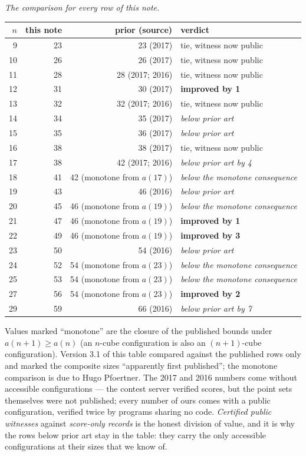 \documentclass[11pt,a4paper]{article}
\begin{document}
\emph{The comparison for every row of this note.}
\begin{center}
\begin{tabular}{rrrl}
\toprule
$n$ & this note & prior (source) & verdict\\
\midrule
 9 & 23 & 23 (2017) & tie, witness now public\\
10 & 26 & 26 (2017) & tie, witness now public\\
11 & 28 & 28 (2017; 2016) & tie, witness now public\\
12 & 31 & 30 (2017) & \textbf{improved by 1}\\
13 & 32 & 32 (2017; 2016) & tie, witness now public\\
14 & 34 & 35 (2017) & \emph{below prior art}\\
15 & 35 & 36 (2017) & \emph{below prior art}\\
16 & 38 & 38 (2017) & tie, witness now public\\
17 & 38 & 42 (2017; 2016) & \emph{below prior art by 4}\\
18 & 41 & 42 (monotone from $a(17)$) & \emph{below the monotone consequence}\\
19 & 43 & 46 (2016) & \emph{below prior art}\\
20 & 45 & 46 (monotone from $a(19)$) & \emph{below the monotone consequence}\\
21 & 47 & 46 (monotone from $a(19)$) & \textbf{improved by 1}\\
22 & 49 & 46 (monotone from $a(19)$) & \textbf{improved by 3}\\
23 & 50 & 54 (2016) & \emph{below prior art}\\
24 & 52 & 54 (monotone from $a(23)$) & \emph{below the monotone consequence}\\
25 & 53 & 54 (monotone from $a(23)$) & \emph{below the monotone consequence}\\
27 & 56 & 54 (monotone from $a(23)$) & \textbf{improved by 2}\\
29 & 59 & 66 (2016) & \emph{below prior art by 7}\\
\bottomrule
\end{tabular}
\end{center}
Values marked ``monotone'' are the closure of the published bounds under $a(n+1)\ge a(n)$
(an $n$-cube configuration is also an $(n+1)$-cube configuration).  Version 3.1 of this table
compared against the published rows only and marked the composite sizes ``apparently first
published''; the monotone comparison is due to Hugo Pfoertner.  The 2017 and 2016 numbers come without accessible configurations --- the contest server verified
scores, but the point sets themselves were not published; every number of ours comes with a public
configuration, verified twice by programs sharing no code.  \emph{Certified public witnesses} against
\emph{score-only records} is the honest division of value, and it is why the rows below prior art stay
in the table: they carry the only accessible configurations at their sizes that we know of.
\end{document}

